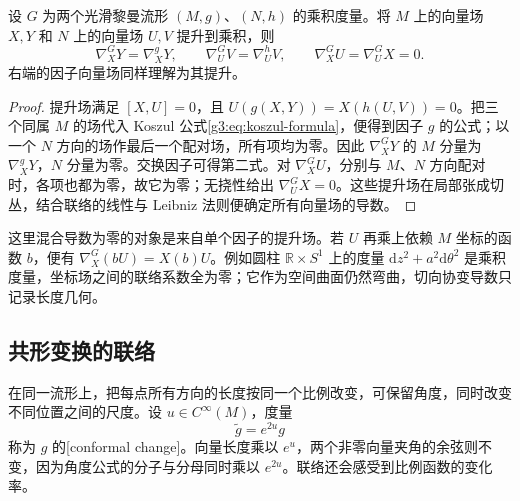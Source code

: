 \begin{proposition}\label{g3:prop:product-connection}
	设 \(G\) 为两个光滑黎曼流形 \((M,g)\)、\((N,h)\) 的乘积度量。将 \(M\) 上的向量场 \(X,Y\) 和 \(N\) 上的向量场 \(U,V\) 提升到乘积，则
	\begin{equation}\label{g3:eq:product-connection}
		\nabla^G_XY=\nabla^g_XY,\qquad
		\nabla^G_UV=\nabla^h_UV,\qquad
		\nabla^G_XU=\nabla^G_UX=0.
	\end{equation}
	右端的因子向量场同样理解为其提升。
\end{proposition}
\begin{proof}
	提升场满足 \([X,U]=0\)，且 \(U(g(X,Y))=X(h(U,V))=0\)。把三个同属 \(M\) 的场代入 Koszul 公式\eqref{g3:eq:koszul-formula}，便得到因子 \(g\) 的公式；以一个 \(N\) 方向的场作最后一个配对场，所有项均为零。因此 \(\nabla^G_XY\) 的 \(M\) 分量为 \(\nabla^g_XY\)，\(N\) 分量为零。交换因子可得第二式。对 \(\nabla^G_XU\)，分别与 \(M\)、\(N\) 方向配对时，各项也都为零，故它为零；无挠性给出 \(\nabla^G_UX=0\)。这些提升场在局部张成切丛，结合联络的线性与 Leibniz 法则便确定所有向量场的导数。
\end{proof}

这里混合导数为零的对象是来自单个因子的提升场。若 \(U\) 再乘上依赖 \(M\) 坐标的函数 \(b\)，便有 \(\nabla^G_X(bU)=X(b)U\)。例如圆柱 \(\mathbb R\times S^1\) 上的度量 \(\mathrm dz^2+a^2\mathrm d\theta^2\) 是乘积度量，坐标场之间的联络系数全为零；它作为空间曲面仍然弯曲，切向协变导数只记录长度几何。

\subsection{共形变换的联络}
\label{g3:subsec:0104:02}
在同一流形上，把每点所有方向的长度按同一个比例改变，可保留角度，同时改变不同位置之间的尺度。设 \(u\in C^\infty(M)\)，度量
\[
	\widetilde g=e^{2u}g
\]
称为 \(g\) 的[conformal change]。向量长度乘以 \(e^u\)，两个非零向量夹角的余弦则不变，因为角度公式的分子与分母同时乘以 \(e^{2u}\)。联络还会感受到比例函数的变化率。

